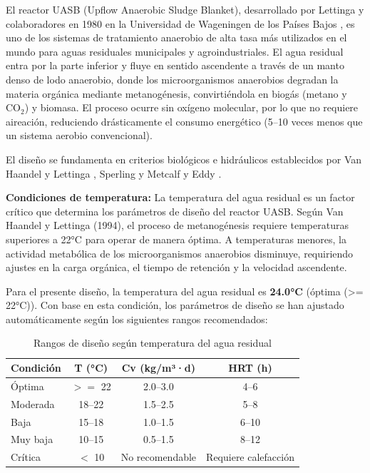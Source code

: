 

El reactor UASB (Upflow Anaerobic Sludge Blanket), desarrollado por Lettinga y colaboradores en 1980 en la Universidad de Wageningen de los Países Bajos \cite{vanhaandel1994}, es uno de los sistemas de tratamiento anaerobio de alta tasa más utilizados en el mundo para aguas residuales municipales y agroindustriales. El agua residual entra por la parte inferior y fluye en sentido ascendente a través de un manto denso de lodo anaerobio, donde los microorganismos anaerobios degradan la materia orgánica mediante metanogénesis, convirtiéndola en biogás (metano y CO$_2$) y biomasa. El proceso ocurre sin oxígeno molecular, por lo que no requiere aireación, reduciendo drásticamente el consumo energético (5--10 veces menos que un sistema aerobio convencional).

El diseño se fundamenta en criterios biológicos e hidráulicos establecidos por Van Haandel y Lettinga \cite{vanhaandel1994}, Sperling \cite{sperling2007} y Metcalf y Eddy \cite{metcalf2014}.

\textbf{Condiciones de temperatura:} La temperatura del agua residual es un factor crítico que determina los parámetros de diseño del reactor UASB. Según Van Haandel y Lettinga (1994), el proceso de metanogénesis requiere temperaturas superiores a 22°C para operar de manera óptima. A temperaturas menores, la actividad metabólica de los microorganismos anaerobios disminuye, requiriendo ajustes en la carga orgánica, el tiempo de retención y la velocidad ascendente.

Para el presente diseño, la temperatura del agua residual es \textbf{24.0°C} (óptima (>= 22°C)). Con base en esta condición, los parámetros de diseño se han ajustado automáticamente según los siguientes rangos recomendados:

\begin{table}[H]
\centering
\caption{Rangos de diseño según temperatura del agua residual}
\small
\begin{tabular}{lccc}
\toprule
\textbf{Condición} & \textbf{T (°C)} & \textbf{Cv (kg/m³·d)} & \textbf{HRT (h)} \\
\midrule
Óptima & $>=$ 22 & 2.0--3.0 & 4--6 \\
Moderada & 18--22 & 1.5--2.5 & 5--8 \\
Baja & 15--18 & 1.0--1.5 & 6--10 \\
Muy baja & 10--15 & 0.5--1.5 & 8--12 \\
Crítica & $<$ 10 & No recomendable & Requiere calefacción \\
\bottomrule
\end{tabular}
\end{table}

